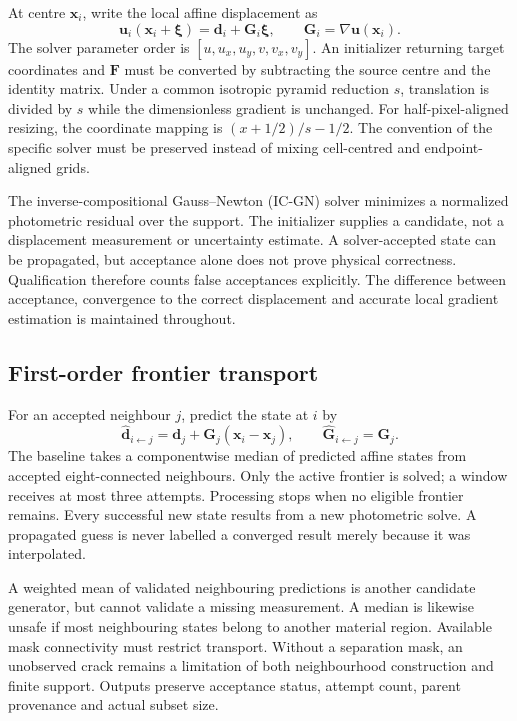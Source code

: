 \documentclass[11pt,a4paper]{article}
\newcommand{\uu}{\mathbf u}\newcommand{\xx}{\mathbf x}\newcommand{\FF}{\mathbf F}
\begin{document}
At centre $\xx_i$, write the local affine displacement as
\begin{equation}\uu_i(\xx_i+\boldsymbol\xi)=\mathbf d_i+\mathbf G_i\boldsymbol\xi,\qquad \mathbf G_i=\nabla\uu(\xx_i).\end{equation}
The solver parameter order is $[u,u_x,u_y,v,v_x,v_y]$. An initializer returning target coordinates and $\FF$ must be converted by subtracting the source centre and the identity matrix. Under a common isotropic pyramid reduction $s$, translation is divided by $s$ while the dimensionless gradient is unchanged. For half-pixel-aligned resizing, the coordinate mapping is $(x+1/2)/s-1/2$. The convention of the specific solver must be preserved instead of mixing cell-centred and endpoint-aligned grids.

The inverse-compositional Gauss--Newton (IC-GN) solver minimizes a normalized photometric residual over the support. The initializer supplies a candidate, not a displacement measurement or uncertainty estimate. A solver-accepted state can be propagated, but acceptance alone does not prove physical correctness. Qualification therefore counts false acceptances explicitly. The difference between acceptance, convergence to the correct displacement and accurate local gradient estimation is maintained throughout.

\subsection{First-order frontier transport}
For an accepted neighbour $j$, predict the state at $i$ by
\begin{equation}
\widehat{\mathbf d}_{i\leftarrow j}=\mathbf d_j+\mathbf G_j(\xx_i-\xx_j),\qquad \widehat{\mathbf G}_{i\leftarrow j}=\mathbf G_j.
\end{equation}
The baseline takes a componentwise median of predicted affine states from accepted eight-connected neighbours. Only the active frontier is solved; a window receives at most three attempts. Processing stops when no eligible frontier remains. Every successful new state results from a new photometric solve. A propagated guess is never labelled a converged result merely because it was interpolated.

A weighted mean of validated neighbouring predictions is another candidate generator, but cannot validate a missing measurement. A median is likewise unsafe if most neighbouring states belong to another material region. Available mask connectivity must restrict transport. Without a separation mask, an unobserved crack remains a limitation of both neighbourhood construction and finite support. Outputs preserve acceptance status, attempt count, parent provenance and actual subset size.
\end{document}
